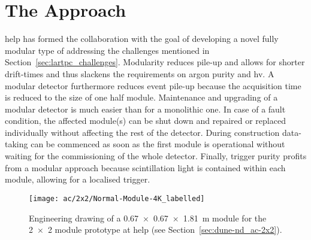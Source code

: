 \section{The \AC{} Approach}
\label{sec:ac_argoncube}

\gls{help} has formed the \AC{} collaboration with the goal of developing a novel fully modular type of \lartpc{} addressing the challenges mentioned in Section~\ref{sec:lartpc_challenges}.
Modularity reduces pile-up and allows for shorter drift-times and thus slackens the requirements on argon purity and \gls{hv}.
A modular detector furthermore reduces event pile-up because the acquisition time is reduced to the size of one half module.
Maintenance and upgrading of a modular detector is much easier than for a monolithic one.
In case of a fault condition, the affected module(s) can be shut down and repaired or replaced individually without affecting the rest of the detector.
During construction data-taking can be commenced as soon as the first module is operational without waiting for the commissioning of the whole detector.
Finally, trigger purity profits from a modular approach because scintillation light is contained within each module, allowing for a localised trigger.

\begin{figure}[htb]
	\centering
	\texttt{[image: ac/2x2/Normal-Module-4K\_labelled]}
	\caption[\AC{} module engineering drawing]{%
		Engineering drawing of a \SI{0.67 x 0.67 x 1.81}{\metre} \AC{} module for the \num{2 x 2} module prototype at \acrshort{help} (see Section~\ref{sec:dune-nd_ac-2x2}).
	}
	\label{fig:ac_module}
\end{figure}


